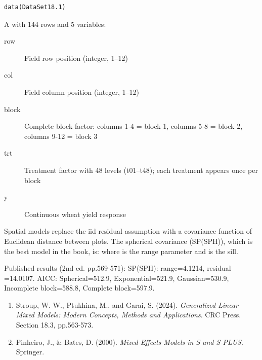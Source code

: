 \documentclass[a4paper]{book}
\begin{document}
%
\begin{Usage}
\begin{verbatim}
data(DataSet18.1)
\end{verbatim}
\end{Usage}
%
\begin{Format}
A  with 144 rows and 5 variables:
\begin{description}

\item[row] Field row position (integer, 1–12)
\item[col] Field column position (integer, 1–12)
\item[block] Complete block factor: columns 1-4 = block 1,
columns 5-8 = block 2, columns 9-12 = block 3
\item[trt] Treatment factor with 48 levels (t01–t48);
each treatment appears once per block
\item[y] Continuous wheat yield response

\end{description}

\end{Format}
%
\begin{Details}
Spatial models replace the iid residual assumption with a covariance
function of Euclidean distance  between plots.  The spherical
covariance (SP(SPH)), which is the best model in the book, is:
where  is the range parameter and  is the sill.

Published results (2nd ed. pp.569-571):
SP(SPH): range=4.1214, residual =14.0107.
AICC: Spherical=512.9, Exponential=521.9, Gaussian=530.9,
Incomplete block=588.8, Complete block=597.9.
\end{Details}
%
\begin{References}
\begin{enumerate}

\item{} Stroup, W. W., Ptukhina, M., and Garai, S. (2024).
\emph{Generalized Linear Mixed Models: Modern Concepts,
Methods and Applications}. CRC Press. Section 18.3, pp.563-573.
\item{} Pinheiro, J., \& Bates, D. (2000).
\emph{Mixed-Effects Models in S and S-PLUS}. Springer.

\end{enumerate}

\end{References}
\end{document}
